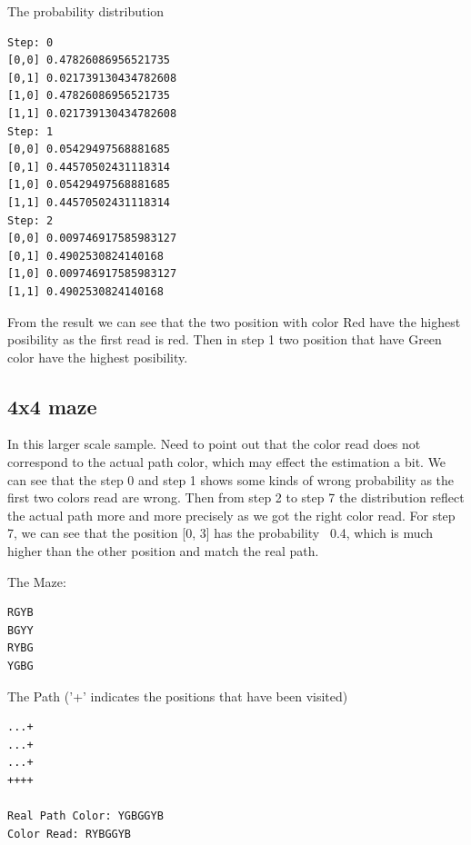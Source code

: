 \documentclass{article}
\begin{document}
The probability distribution
\begin{lstlisting}
Step: 0
[0,0] 0.47826086956521735
[0,1] 0.021739130434782608
[1,0] 0.47826086956521735
[1,1] 0.021739130434782608
Step: 1
[0,0] 0.05429497568881685
[0,1] 0.44570502431118314
[1,0] 0.05429497568881685
[1,1] 0.44570502431118314
Step: 2
[0,0] 0.009746917585983127
[0,1] 0.4902530824140168
[1,0] 0.009746917585983127
[1,1] 0.4902530824140168
\end{lstlisting}
From the result we can see that the two position with color Red have the highest posibility as the first read is red. Then in step 1 two position that have Green color have the highest posibility. 

\subsection{4x4 maze}
In this larger scale sample. Need to point out that the color read does not correspond to the actual path color, which may effect the estimation a bit. We can see that the step 0 and step 1 shows some kinds of wrong probability as the first two colors read are wrong. Then from step 2 to step 7 the distribution reflect the actual path more and more precisely as we got the right color read. For step 7, we can see that the position [0, 3] has the probability ~0.4, which is much higher than the other position and match the real path.

The Maze:
\begin{lstlisting}
RGYB
BGYY
RYBG
YGBG
\end{lstlisting}

The Path ('+' indicates the positions that have been visited)
\begin{lstlisting}
...+
...+
...+
++++

Real Path Color: YGBGGYB
Color Read: RYBGGYB
\end{lstlisting}
\end{document}
